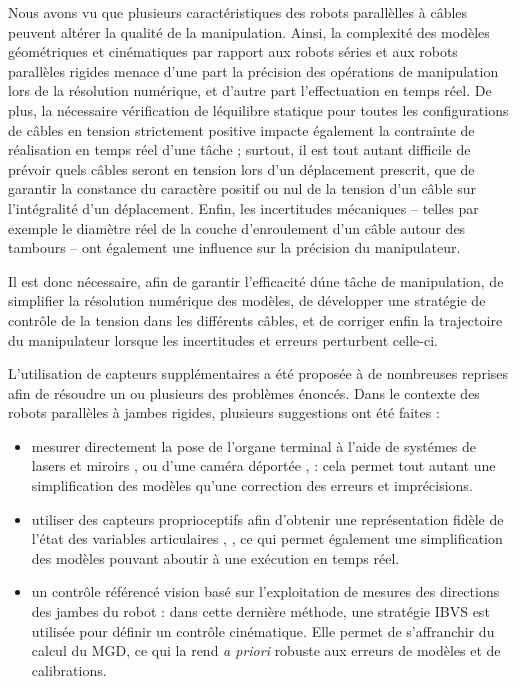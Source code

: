 Nous avons vu que plusieurs caract\'eristiques des robots parall\`elles
\`a c\^ables peuvent alt\'erer la qualit\'e de la manipulation. Ainsi, la
complexit\'e des mod\`eles g\'eom\'etriques et cin\'ematiques par rapport aux
robots s\'eries et aux robots parall\`eles rigides menace d'une part la
pr\'ecision des op\'erations de manipulation lors de la r\'esolution
num\'erique, et d'autre part l'effectuation en temps r\'eel. De plus, la
n\'ecessaire v\'erification de l\'equilibre statique pour toutes les
configurations de c\^ables en tension strictement positive impacte \'egalement
la contrainte de r\'ealisation en temps r\'eel d'une t\^ache ; surtout, il est
tout autant difficile de pr\'evoir quels c\^ables seront en tension lors d'un
d\'eplacement prescrit, que de garantir la constance du caract\`ere positif ou
nul de la tension d'un c\^able sur l'int\'egralit\'e d'un d\'eplacement. Enfin,
les incertitudes m\'ecaniques -- telles par exemple le diam\`etre r\'eel de la
couche d'enroulement d'un c\^able autour des tambours -- ont \'egalement une
influence sur la pr\'ecision du manipulateur.

Il est donc n\'ecessaire, afin de garantir l'efficacit\'e d\'une t\^ache de
manipulation, de simplifier la r\'esolution num\'erique des mod\`eles, de
d\'evelopper une strat\'egie de contr\^ole de la tension dans les diff\'erents
c\^ables, et de corriger enfin la trajectoire du manipulateur lorsque les
incertitudes et erreurs perturbent celle-ci.

L'utilisation de capteurs suppl\'ementaires a \'et\'e propos\'ee \`a de
nombreuses reprises afin de r\'esoudre un ou plusieurs des probl\`emes
\'enonc\'es. Dans le contexte des robots parall\`eles \`a jambes rigides,
plusieurs suggestions ont \'et\'e faites :
\begin{itemize}
 \item mesurer directement la pose de l'organe terminal \`a l'aide de
syst\'emes de lasers et miroirs \cite{marantette1995machine}, \cite{Heeren:1992}
ou d'une cam\'era d\'eport\'ee \cite{dallej.2006}, \cite{paccot.2008} : cela
permet tout autant une simplification des mod\`eles qu'une correction des
erreurs et impr\'ecisions.
\item utiliser des capteurs proprioceptifs afin d'obtenir une repr\'esentation
fid\`ele de l'\'etat des variables articulaires
\cite{merlet.1993}, \cite{parenti.2000}, ce qui permet \'egalement une
simplification des mod\`eles pouvant aboutir \`a une ex\'ecution en temps
r\'eel. 
\item un contr\^ole r\'ef\'erenc\'e vision bas\'e sur l'exploitation de mesures
des directions des jambes du robot \cite{andreff2007} : dans cette derni\`ere
m\'ethode, une strat\'egie IBVS est utilis\'ee pour d\'efinir un contr\^ole
cin\'ematique. Elle permet de s'affranchir du calcul du MGD, ce qui la rend
{\it a priori} robuste aux erreurs de mod\`eles et de calibrations.
\end{itemize}

